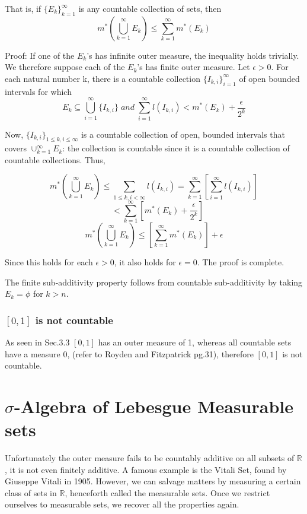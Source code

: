 \documentclass{article}
\begin{document}
That is, if $\{E_k\}_{k=1}^{\infty} $ is any countable collection of sets, then
$$ m^*(\bigcup_{k=1}^{\infty} E_k) \leq \sum_{k=1}^{\infty} m^{*}(E_k)$$

Proof: If one of the $E_k$'s has infinite outer measure, the inequality holds trivially. We therefore suppose each of the $E_k$'s has finite outer measure. Let $\epsilon > 0$. For each natural number k, there is a countable collection $\{ I_{k,i} \}_{i=1}^{\infty}$ of open bounded intervals for which
$$ E_k \subseteq \bigcup_{i=1}^{\infty} \{ I_{k,i} \} \; and \; \sum_{i=1}^{\infty} l(I_{k,i}) < m^{*}(E_k) +\frac{\epsilon}{2^k}  $$

Now, $\{I_{k,i}\}_{1 \leq k , i \leq \infty}$ is a countable collection of open, bounded intervals that covers $\cup_{k=1}^{\infty} E_k$: the collection is countable since it is a countable collection of countable collections. Thus,

$$ m^{*}(\bigcup_{k=1}^{\infty} E_k) \leq \sum_{1\leq k,i<\infty } l(I_{k,i})= \sum_{k=1}^{\infty}[\sum_{i=1}^{\infty} l(I_{k,i})]$$
$$\;\;\;<\sum_{k=1}^{\infty}[m^{*}(E_k) + \frac{\epsilon}{2^k}]$$
$$  m^{*}(\bigcup_{k=1}^{\infty} E_k) \leq [\sum_{k=1}^{\infty}m^{*}(E_k)]+\epsilon$$

Since this holds for each $\epsilon>0$, it also holds for $\epsilon=0$. The proof is complete.

The finite sub-additivity property follows from countable sub-additivity by taking $E_k = \phi$ for $k>n$.

\subsubsection{$[0,1]$ is not countable}

As seen in Sec.3.3 $[0,1]$ has an outer measure of 1, whereas all countable sets have a measure 0, (refer to Royden and Fitzpatrick pg.31), therefore $[0,1]$ is not countable.


\section{$\sigma$-Algebra of Lebesgue Measurable sets}

Unfortunately the outer measure fails to be countably additive on all subsets of $\mathbb{R}$, it is not even finitely additive. A famous example is the Vitali Set, found by Giuseppe Vitali in 1905. However, we can salvage matters by measuring a certain class of sets in $\mathbb{R}$, henceforth called the measurable sets. Once we restrict ourselves to measurable sets, we recover all the properties again.
\end{document}
